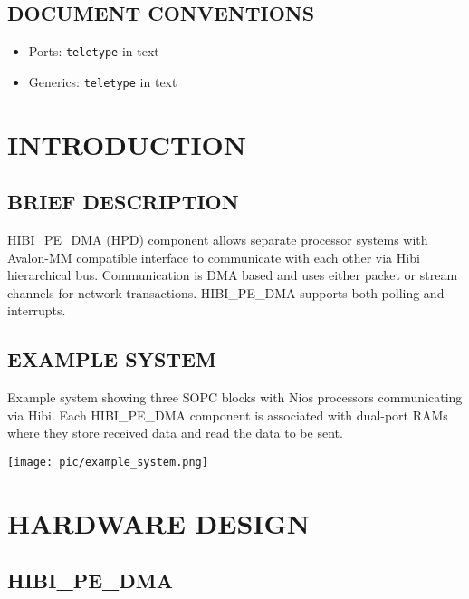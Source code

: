 \documentclass[a4paper,10pt,oneside,final]{article}
\begin{document}
\subsection{DOCUMENT CONVENTIONS}


\begin{itemize}
\item Ports: \texttt{teletype} in text
\item Generics: \texttt{teletype} in text
\end{itemize}



\newpage
\section{INTRODUCTION}

\subsection{BRIEF DESCRIPTION}

HIBI\_PE\_DMA (HPD) component allows separate processor systems with
Avalon-MM compatible interface to communicate with each other via Hibi
hierarchical bus. Communication is DMA based and uses either packet or
stream channels for network transactions. HIBI\_PE\_DMA supports both
polling and interrupts.

\subsection{EXAMPLE SYSTEM}

Example system showing three SOPC blocks with Nios processors
communicating via Hibi. Each HIBI\_PE\_DMA component is associated
with dual-port RAMs where they store received data and read the data
to be sent.

\begin{center}  
  \texttt{[image: pic/example\_system.png]}
  \label{fig:example_system}
\end{center}



\newpage
\section{HARDWARE DESIGN}

\subsection{HIBI\_PE\_DMA}
\end{document}

